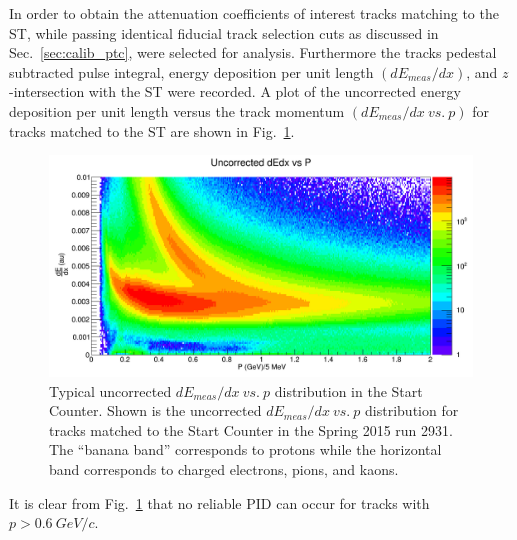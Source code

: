 In order to obtain the attenuation coefficients of interest tracks matching to the ST, while passing identical fiducial track selection cuts as discussed in Sec.~\ref{sec:calib_ptc}, were selected for analysis.  Furthermore the tracks pedestal subtracted pulse integral, energy deposition per unit length $(dE_{meas} / dx)$, and $z$-intersection with the ST were recorded.  A plot of the uncorrected energy deposition per unit length versus the track momentum $(dE_{meas} / dx\ vs.\ p)$ for tracks matched to the ST are shown in Fig.~\ref{fig:dEdx_vs_p_uncorr}.
	\begin{figure}[!htb]
		\centering
		\includegraphics[width=1.0\columnwidth]{calibration/figs/dEdx_vs_p_uncorr}
		\caption{Typical uncorrected $dE_{meas}/dx\ vs.\ p$ distribution in the Start Counter.  Shown is the uncorrected $dE_{meas}/dx\ vs.\ p$ distribution for tracks matched to the Start Counter in the Spring 2015 run 2931. The ``banana band'' corresponds to protons while the horizontal band corresponds to charged electrons, pions, and kaons.}
		\label{fig:dEdx_vs_p_uncorr}
	\end{figure}
It is clear from Fig.~\ref{fig:dEdx_vs_p_uncorr} that no reliable PID can occur for tracks with $p > 0.6\ GeV/c$.

